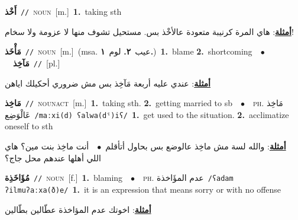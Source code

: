\documentclass[10pt,a4paper,twoside]{article} %
\begin{document}
\begin{multicols}{2}
{\setlength\topsep{0pt}\textbf{\foreignlanguage{arabic}{أَخْذ}}\ {\color{gray}\texttt{//}\color{black}}\ \textsc{noun}\ [m.]\ \textbf{1.}~taking sth\  \begin{flushright}\color{gray}\foreignlanguage{arabic}{\textbf{\underline{\foreignlanguage{arabic}{أمثلة}}}: هاي المرة كرنيبة متعودة عالأخْذ بس. مستحيل تشوف منها لا عزومة ولا سخام!}\end{flushright}\color{black}} \vspace{2mm}

{\setlength\topsep{0pt}\textbf{\foreignlanguage{arabic}{مَأْخَذ}}\ {\color{gray}\texttt{//}\color{black}}\ \textsc{noun}\ [m.]\ \color{gray}(msa. \foreignlanguage{arabic}{عيب}~\foreignlanguage{arabic}{\textbf{٢.}}  \foreignlanguage{arabic}{لوم}~\foreignlanguage{arabic}{\textbf{١.}})\color{black}\ \textbf{1.}~blame  \textbf{2.}~shortcoming\ \ $\bullet$\ \ \setlength\topsep{0pt}\textbf{\foreignlanguage{arabic}{مَآخِذ}}\ {\color{gray}\texttt{//}\color{black}}\ [pl.]\  \begin{flushright}\color{gray}\foreignlanguage{arabic}{\textbf{\underline{\foreignlanguage{arabic}{أمثلة}}}: عندي عليه أربعة مَآخِذ بس مش ضروري أحكيلك اياهن}\end{flushright}\color{black}} \vspace{2mm}

{\setlength\topsep{0pt}\textbf{\foreignlanguage{arabic}{مَاخِذ}}\ {\color{gray}\texttt{//}\color{black}}\ \textsc{noun\textunderscore act}\ [m.]\ \textbf{1.}~taking sth.  \textbf{2.}~getting married to sb\ \ $\bullet$\ \ \textsc{ph.} \color{gray} \foreignlanguage{arabic}{مَاخِذ عَالْوَضِع}\color{black}\ {\color{gray}\texttt{/{\sffamily maːxi(d) ʕalwa(dˤ)iʕ}/}\color{black}}\ \textbf{1.}~get used to the situation.  \textbf{2.}~acclimatize oneself to sth\  \begin{flushright}\color{gray}\foreignlanguage{arabic}{\textbf{\underline{\foreignlanguage{arabic}{أمثلة}}}: والله لسة مش ماخِذ عالوضع بس بحاول أتأقلم\ $\bullet$\ \  أنت ماخِذ بنت مين؟ هاي اللي أهلها عندهم محل جاج؟}\end{flushright}\color{black}} \vspace{2mm}

{\setlength\topsep{0pt}\textbf{\foreignlanguage{arabic}{مُؤَاخَذِة}}\ {\color{gray}\texttt{//}\color{black}}\ \textsc{noun}\ [f.]\ \textbf{1.}~blaming\ \ $\bullet$\ \ \textsc{ph.} \color{gray} \foreignlanguage{arabic}{عدم المؤَاخذة}\color{black}\ {\color{gray}\texttt{/{\sffamily ʕadam ʔilmuʔaːxa(ð)e}/}\color{black}}\ \textbf{1.}~it is an expression that means sorry or with no offense\  \begin{flushright}\color{gray}\foreignlanguage{arabic}{\textbf{\underline{\foreignlanguage{arabic}{أمثلة}}}: اخوتك عدم المؤاخذة عطّالين بطّالين}\end{flushright}\color{black}} \vspace{2mm}


\end{multicols}
\end{document}
